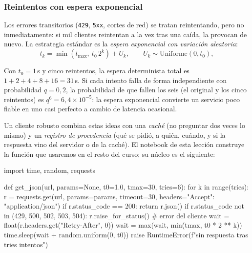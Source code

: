 \subsubsection{Reintentos con espera exponencial}

Los errores transitorios (\texttt{429}, \texttt{5xx}, cortes de red) se tratan reintentando, pero no inmediatamente: si mil clientes reintentan a la vez tras una caída, la provocan de nuevo. La estrategia estándar es la \emph{espera exponencial con variación aleatoria}:
\begin{equation}\label{eq:02-backoff}
t_k = \min\!\left(t_{\max},\ t_0\, 2^{k}\right) + U_k, \qquad U_k \sim \mathrm{Uniforme}(0, t_0),
\end{equation}
\begin{simbolos}
\end{simbolos}
Con $t_0=1$\,s y cinco reintentos, la espera determinista total es $1+2+4+8+16=31$\,s. Si cada intento falla de forma independiente con probabilidad $q=0{,}2$, la probabilidad de que fallen los seis (el original y los cinco reintentos) es $q^6 = 6{,}4\times10^{-5}$: la espera exponencial convierte un servicio poco fiable en uno casi perfecto a cambio de latencia ocasional.

Un cliente robusto combina estas ideas con una \emph{caché} (no preguntar dos veces lo mismo) y un \emph{registro de procedencia} (qué se pidió, a quién, cuándo, y si la respuesta vino del servidor o de la caché). El notebook de esta lección construye la función  que usaremos en el resto del curso; su núcleo es el siguiente:

\begin{codigo}[cliente.py]
import time, random, requests

def get_json(url, params=None, t0=1.0, tmax=30, tries=6):
    for k in range(tries):
        r = requests.get(url, params=params, timeout=30,
                         headers={"Accept": "application/json"})
        if r.status_code == 200:
            return r.json()
        if r.status_code not in (429, 500, 502, 503, 504):
            r.raise_for_status()           # error del cliente
        wait = float(r.headers.get("Retry-After", 0))
        wait = max(wait, min(tmax, t0 * 2 ** k))
        time.sleep(wait + random.uniform(0, t0))
    raise RuntimeError(f"sin respuesta tras {tries} intentos")
\end{codigo}

